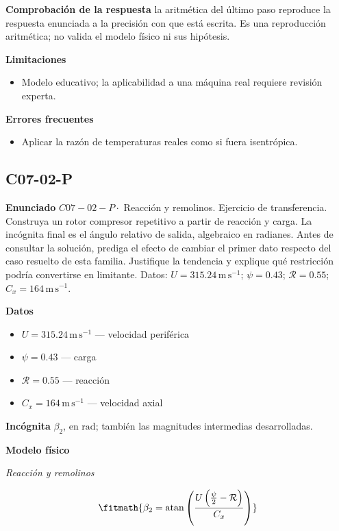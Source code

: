 \documentclass[10pt,openany]{book}
\begin{document}
\noindent\textbf{Comprobación de la respuesta} la aritmética del último paso reproduce la respuesta enunciada a la precisión con que está escrita. Es una reproducción aritmética; no valida el modelo físico ni sus hipótesis.

\noindent\textbf{Limitaciones}
\begin{itemize}
\item Modelo educativo; la aplicabilidad a una máquina real requiere revisión experta.
\end{itemize}

\noindent\textbf{Errores frecuentes}
\begin{itemize}
\item Aplicar la razón de temperaturas reales como si fuera isentrópica.
\end{itemize}
\subsection*{C07-02-P}

\noindent\textbf{Enunciado}
\(C07-02-P \cdot\) Reacción y remolinos. Ejercicio de transferencia. Construya un rotor compresor repetitivo a partir de reacción y carga. La incógnita final es el ángulo relativo de salida, algebraico en radianes. Antes de consultar la solución, prediga el efecto de cambiar el primer dato respecto del caso resuelto de esta familia. Justifique la tendencia y explique qué restricción podría convertirse en limitante. Datos: \(U=315.24\, \mathrm{m}\,\mathrm{s}^{-1}\); \(\psi=0.43\); \(\mathcal R=0.55\); \(C_x=164\, \mathrm{m}\,\mathrm{s}^{-1}\).

\noindent\textbf{Datos}
\begin{itemize}
\item $U = 315.24\,\mathrm{m}\,\mathrm{s}^{-1}$ — velocidad periférica
\item $\psi = 0.43$ — carga
\item $\mathcal R = 0.55$ — reacción
\item $C_x = 164\,\mathrm{m}\,\mathrm{s}^{-1}$ — velocidad axial
\end{itemize}

\noindent\textbf{Incógnita}
$\beta_2$, en $\mathrm{rad}$; también las magnitudes intermedias desarrolladas.

\noindent\textbf{Modelo físico}

\noindent\textit{Reacción y remolinos}

\[
\fitmath{\beta_2=\operatorname{atan}{\left(\frac{U \left(\frac{\psi}{2} - \mathcal R\right)}{C_x} \right)}}
\]
\end{document}
